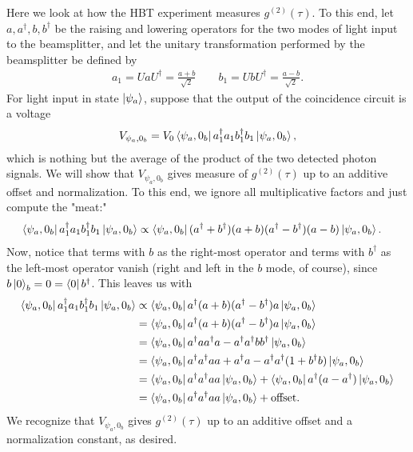 \documentclass{article}
\theoremstyle{definition}
\newcommand{\f}[2]{\frac{#1}{#2}}
\begin{document}
\noindent Here we look at how the HBT experiment measures $g^{(2)}(\tau)$. To this end, let $a,a^\dagger,b,b^\dagger$ be the raising and lowering operators for the two modes of light input to the beamsplitter, and let the unitary transformation performed by the beamsplitter be defined by 
\begin{align*}
a_1 = U a U^\dagger = \f{a+b}{\sqrt{2}} \quad\quad b_1 = UbU^\dagger = \f{a-b}{\sqrt{2}}.
\end{align*}
For light input in state $\ket{\psi_a}$, suppose that the output of the coincidence circuit is a voltage
\begin{align*}
V_{\psi_a,0_b} = V_0 \bra{\psi_a,  0_b} a_1^\dagger a_1 b_1^\dagger b_1 \ket{\psi_a, 0_b},
\end{align*}
which is nothing but the average of the product of the two detected photon signals. We will show that $V_{\psi_a,0_b}$ gives measure of $g^{(2)}(\tau)$ up to an additive offset and normalization. To this end, we ignore all multiplicative factors and just compute the "meat:"
\begin{align*}
\bra{\psi_a, 0_b} a_1^\dagger a_1 b_1^\dagger b_1 \ket{\psi_a, 0_b} 
&\propto \bra{\psi_a, 0_b}  (a^\dagger + b^\dagger)( a + b)( a^\dagger - b^\dagger)( a- b)   \ket{\psi_a, 0_b}.
\end{align*}
Now, notice that terms with $b$ as the right-most operator and terms with $b^\dagger$ as the left-most operator vanish (right and left in the $b$ mode, of course), since $b\ket{0}_b = 0 = \bra{0}b^\dagger$. This leaves us with
\begin{align*}
\bra{\psi_a, 0_b} a_1^\dagger a_1 b_1^\dagger b_1 \ket{\psi_a, 0_b}  
&\propto \bra{\psi_a, 0_b}  a^\dagger(a+b)(a^\dagger - b^\dagger) a \ket{\psi_a, 0_b}  \\
&= \bra{\psi_a, 0_b}  a^\dagger(a+b)(a^\dagger - b^\dagger) a \ket{\psi_a, 0_b}  \\
&= \bra{\psi_a, 0_b}  a^\dagger a a^\dagger a -a^\dagger a^\dagger bb^\dagger \ket{\psi_a, 0_b} \\
&= \bra{\psi_a, 0_b} a^\dagger a^\dagger a  a  + a^\dagger a - a^\dagger a^\dagger (1+b^\dagger b) \ket{\psi_a, 0_b} \\
&=  \bra{\psi_a, 0_b} a^\dagger a^\dagger a a \ket{\psi_a, 0_b} + 
 \bra{\psi_a, 0_b} a^\dagger (a - a^\dagger)  \ket{\psi_a, 0_b}\\
 &= \bra{\psi_a, 0_b} a^\dagger a^\dagger a a \ket{\psi_a, 0_b} + \text{offset}.
\end{align*}
We recognize that $V_{\psi_a, 0_b}$ gives $g^{(2)}(\tau)$ up to an additive offset and a normalization constant, as desired. 
\end{document}
